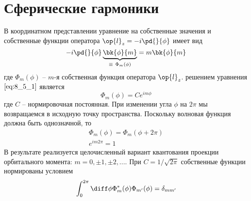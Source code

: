 \section{Сферические гармоники}

В координатном представлении уравнение на собственные значения и собственные функции оператора $\op{l}_z = -i \pd{}{\phi}$ имеет вид
\begin{equation}
\label{eq:8_5_1}
-i \pd{}{\phi} \underbrace{\bk{\phi}{m}}_{\equiv~\Phi_m(\phi)} = m \bk{\phi}{m}
\end{equation}%
%
где $\Phi_m(\phi)$ -- $m$-я собственная функция оператора $\op{l}_z$. решением уравнения $\eqref{eq:8_5_1}$ является
\begin{equation}
\label{eq:8_5_2}
  \Phi_m(\phi) = C e^{i m \phi}
\end{equation}%
%
где $C$ -- нормировочная постоянная. При изменении угла $\phi$ на $2\pi$ мы возвращаемся в исходную точку пространства. Поскольку волновая функция должна быть однозначной, то
$$
\begin{gathered}
\Phi_m(\phi) = \Phi_m(\phi + 2\pi) \\
e^{im2\pi} = 1
\end{gathered}
$$%
%
В результате реализуется целочисленный вариант квантования проекции орбитального момента: $m=0, \pm 1, \pm 2, ...$. При $C = 1/\sqrt{2\pi}$ собственные функции нормированы условием
$$
\int_0^{2\pi} \diff\phi \Phi^*_m(\phi) \Phi_{m'}(\phi) = \delta_{mm'} 
$$


